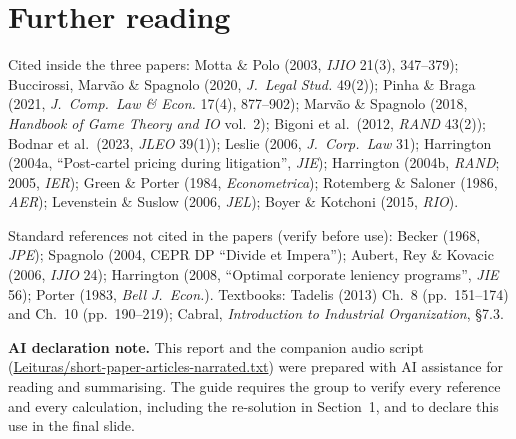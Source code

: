 \documentclass[11pt,a4paper]{article}
\begin{document}
\section{Further reading}
\small
Cited inside the three papers: Motta \& Polo (2003, \emph{IJIO} 21(3), 347--379); Buccirossi,
Marvão \& Spagnolo (2020, \emph{J.\ Legal Stud.} 49(2)); Pinha \& Braga (2021, \emph{J.\ Comp.\ Law
\& Econ.} 17(4), 877--902); Marvão \& Spagnolo (2018, \emph{Handbook of Game Theory and IO} vol.~2);
Bigoni et al.\ (2012, \emph{RAND} 43(2)); Bodnar et al.\ (2023, \emph{JLEO} 39(1)); Leslie (2006,
\emph{J.\ Corp.\ Law} 31); Harrington (2004a, ``Post-cartel pricing during litigation'', \emph{JIE});
Harrington (2004b, \emph{RAND}; 2005, \emph{IER}); Green \& Porter (1984, \emph{Econometrica});
Rotemberg \& Saloner (1986, \emph{AER}); Levenstein \& Suslow (2006, \emph{JEL}); Boyer \& Kotchoni
(2015, \emph{RIO}).

\smallskip\noindent Standard references not cited in the papers (verify before use): Becker (1968,
\emph{JPE}); Spagnolo (2004, CEPR DP ``Divide et Impera''); Aubert, Rey \& Kovacic (2006,
\emph{IJIO} 24); Harrington (2008, ``Optimal corporate leniency programs'', \emph{JIE} 56);
Porter (1983, \emph{Bell J.\ Econ.}). Textbooks: Tadelis (2013) Ch.~8 (pp.\ 151--174) and Ch.~10
(pp.\ 190--219); Cabral, \emph{Introduction to Industrial Organization}, \S7.3.

\sloppy\medskip\noindent\textbf{AI declaration note.} This report and the companion audio script
(\url{Leituras/short-paper-articles-narrated.txt}) were prepared with AI assistance for reading
and summarising. The guide requires the group to verify every reference and every calculation,
including the re-solution in Section~1, and to declare this use in the final slide.
\end{document}

